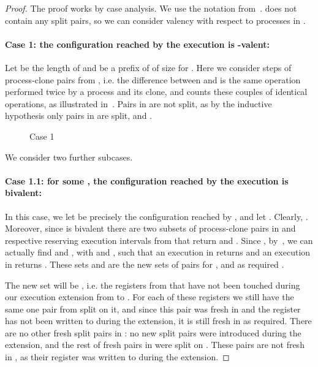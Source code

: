 \begin{proof}
The proof works by case analysis. We use the notation from~.
 does not contain any split pairs, so we can consider valency with respect to processes in .  

\paragraph{Case 1: the configuration reached by the execution  is -valent:}
Let  be the length of  and  be a prefix of  of size  for .
Here we consider steps of process-clone pairs from , 
  i.e. the difference between  and  is the same operation performed twice by a process and its clone,
  and  counts these couples of identical operations,
  as illustrated in~.
Pairs in  are not split, as by the inductive hypothesis only pairs in  are split, 
  and .

\begin{figure}
\label{fig:case1}
\caption{Case 1}
\end{figure}

We consider two further subcases.

\paragraph{Case 1.1: for some , 
  the configuration reached by the execution  is bivalent:}
In this case, we let  be precisely the configuration reached by , 
  and let .
Clearly, .
Moreover, since  is bivalent there are two subsets of  process-clone pairs in  
  and respective reserving execution intervals from  that return  and .
Since , by~, we can actually find  and , 
  with  and , such that
  an execution in  returns  and an execution in  returns .
These sets  and  are the new sets of pairs for , and as required .

The new set  will be , i.e. the registers from  
  that have not been touched during our execution extension  from  to .
For each of these registers we still have the same one pair from  split on it, 
  and since this pair was fresh in  and the register has not been written to during the extension,
  it is still fresh in  as required.  
There are no other fresh split pairs in :
  no new split pairs were introduced during the extension,
  and the rest of fresh pairs in  were split on .
These pairs are not fresh in , as their register was written to during the extension.


\end{proof}
